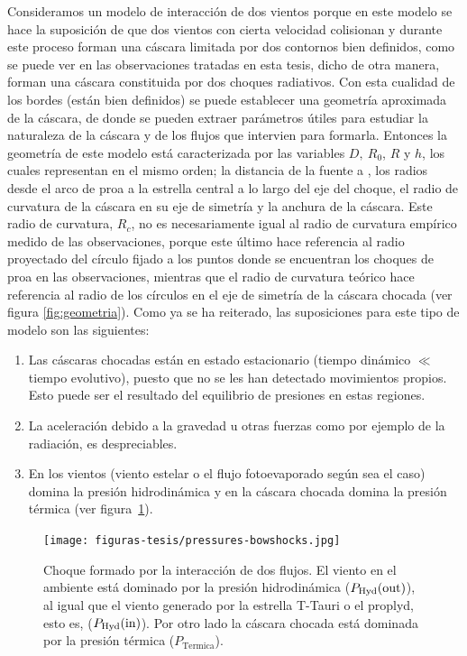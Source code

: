 Consideramos un modelo de interacción de dos vientos porque en este modelo se hace la suposición de que dos vientos con cierta velocidad colisionan y durante este proceso forman una cáscara limitada por dos contornos bien definidos, como se puede ver en las observaciones tratadas en esta tesis, dicho de otra manera, forman una cáscara constituida por dos choques radiativos. Con esta cualidad de los bordes (están bien definidos) se puede establecer una geometría aproximada de la cáscara, de donde se pueden extraer parámetros útiles para estudiar la naturaleza de la cáscara y de los flujos que intervien para formarla. Entonces la geometría de este modelo está caracterizada por las variables \(D,~R_{0}\), \(R\) y \(h\), los cuales representan en el mismo orden; la distancia de la fuente a \thC{}, los radios desde el arco de proa a la estrella central a lo largo del eje del choque, el radio de curvatura de la cáscara en su eje de simetría y la anchura de la cáscara. Este radio de curvatura, \(R_{c}\), no es necesariamente igual al radio de curvatura empírico medido de las observaciones, porque este último hace referencia al radio proyectado del círculo fijado a los puntos donde se encuentran los choques de proa en las observaciones, mientras que el radio de curvatura teórico hace referencia al radio de los círculos en el eje de simetría de la cáscara chocada (ver figura \ref{fig:geometria}). Como ya se ha reiterado, las suposiciones para este tipo de modelo son las siguientes:
\begin{enumerate}
\item Las cáscaras chocadas están en estado estacionario (tiempo dinámico \(\ll\) tiempo evolutivo), puesto que no se les han detectado movimientos propios. Esto puede ser el resultado del equilibrio de presiones en estas regiones.
\item La aceleración debido a la gravedad u otras fuerzas como por ejemplo de la radiación, es despreciables.
\item En los vientos (viento estelar o el flujo fotoevaporado según sea el caso) domina la presión hidrodinámica y en la cáscara chocada domina la presión térmica (ver figura~\ref{fig:interaction}).  
\end{enumerate}

\begin{figure}
  \centering
  \texttt{[image: figuras-tesis/pressures-bowshocks.jpg]}
  \caption{Choque formado por la interacción de dos flujos. El viento en el ambiente está dominado por la presión hidrodinámica  (\(P_{\text{Hyd}}(\mathrm{out}{})\)), al igual que el viento generado por la estrella T-Tauri o el proplyd, esto es, (\(P_{\text{Hyd}}(\mathrm{in}{})\)). Por otro lado la cáscara chocada está dominada por la presión térmica (\(P_{\text{Termica}}\)).}
  \label{fig:interaction}
\end{figure}
 

